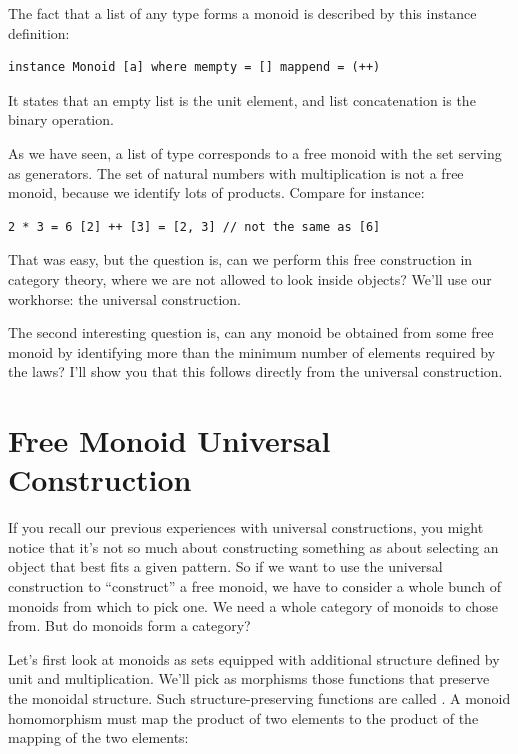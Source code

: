 The fact that a list of any type forms a monoid is described by this
instance definition:

\begin{Verbatim}[commandchars=\\\{\}]
instance Monoid [a] where mempty = [] mappend = (++)
\end{Verbatim}

It states that an empty list \code{{[}{]}} is the unit element, and
list concatenation \code{(++)} is the binary operation.

As we have seen, a list of type  corresponds to a free monoid
with the set  serving as generators. The set of natural
numbers with multiplication is not a free monoid, because we identify
lots of products. Compare for instance:

\begin{Verbatim}[commandchars=\\\{\}]
2 * 3 = 6 [2] ++ [3] = [2, 3] // not the same as [6]
\end{Verbatim}

That was easy, but the question is, can we perform this free
construction in category theory, where we are not allowed to look inside
objects? We'll use our workhorse: the universal construction.

The second interesting question is, can any monoid be obtained from some
free monoid by identifying more than the minimum number of elements
required by the laws? I'll show you that this follows directly from the
universal construction.

\section{Free Monoid Universal
Construction}\label{free-monoid-universal-construction}

If you recall our previous experiences with universal constructions, you
might notice that it's not so much about constructing something as about
selecting an object that best fits a given pattern. So if we want to use
the universal construction to ``construct'' a free monoid, we have to
consider a whole bunch of monoids from which to pick one. We need a
whole category of monoids to chose from. But do monoids form a category?

Let's first look at monoids as sets equipped with additional structure
defined by unit and multiplication. We'll pick as morphisms those
functions that preserve the monoidal structure. Such
structure-preserving functions are called . A monoid
homomorphism must map the product of two elements to the product of the
mapping of the two elements:

